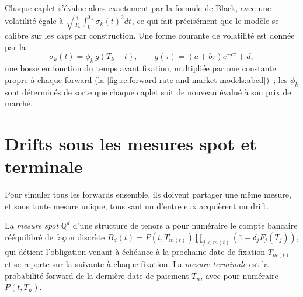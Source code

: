 Chaque caplet s'évalue alors exactement par la formule de Black, avec une volatilité égale à
$\sqrt{\frac1{T_k}\int_0^{T_k}\sigma_k(t)^2dt}$, ce qui fait précisément que le modèle
se calibre sur les caps par construction. Une forme courante de volatilité est donnée par la 
\[
\sigma_k(t) = \phi_k\,g(T_k-t),\qquad g(\tau) = (a+b\tau)e^{-c\tau}+d ,
\]
une bosse en fonction du temps avant fixation, multipliée par une constante propre à chaque forward
(la \cref{fig:rc:forward-rate-and-market-models:abcd})~; les $\phi_k$ sont déterminés de sorte
que chaque caplet soit de nouveau évalué à son prix de marché.

\begin{omfigure}

\label{fig:rc:forward-rate-and-market-models:abcd}
\end{omfigure}

\section{Drifts sous les mesures spot et terminale}

Pour simuler tous les forwards ensemble, ils doivent partager une même mesure, et sous toute
mesure unique, tous sauf un d'entre eux acquièrent un drift.

\begin{definition}\label{def:rc:forward-rate-and-market-models:measures}
La \emph{mesure spot} $\mathbb Q^d$ d'une structure de tenors a pour
numéraire le compte bancaire rééquilibré de façon discrète $B_d(t) =
P(t,T_{m(t)})\prod_{j<m(t)}(1+\delta_jF_j(T_j))$, qui détient l'obligation venant à échéance à
la prochaine date de fixation $T_{m(t)}$ et se reporte sur la suivante à chaque fixation. La
\emph{mesure terminale} est la probabilité forward de la dernière
date de paiement $T_n$, avec pour numéraire $P(t,T_n)$.
\end{definition}

